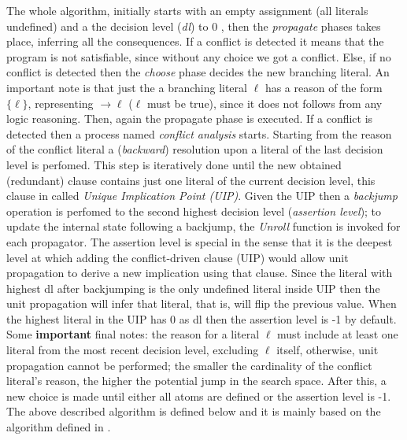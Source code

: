 The whole algorithm, initially starts with an empty assignment (all literals undefined)
and a the decision level (\textit{dl}) to 0  ,
then the \textit{propagate} phases takes place, inferring all the consequences.
If a conflict is detected it means that the program is not satisfiable, since 
without any choice we got a conflict.
Else, if no conflict is detected then the \textit{choose} phase decides the new branching literal.
An important note is that just the a branching literal $\ell$ has a reason of the form $\{\ell\}$, representing
$\rightarrow \ell$ ($\ell$ must be true), since it 
does not follows from any logic reasoning.
Then, again the propagate phase is executed.
If a conflict is detected then a process named \textit{conflict analysis} starts.
Starting from the reason of the conflict literal a (\textit{backward}) resolution upon a literal of the last
decision level is perfomed. This step is iteratively done until the new obtained (redundant) clause 
contains just one literal of the current decision level, this clause in called
\textit{Unique Implication Point (UIP)}.
Given the UIP then a \textit{backjump} operation is perfomed to the second highest decision level
(\textit{assertion level}); to update the internal state following a backjump, the \textit{Unroll}
function is invoked for each propagator.
The assertion level is special in the sense that it is the deepest level
at which adding the conﬂict-driven clause (UIP) would allow unit propagation to derive
a new implication using that clause. Since the literal with highest dl after backjumping 
is the only undefined literal inside UIP then the unit propagation will infer that literal,
that is, will flip the previous value.
When the highest literal in the UIP has 0 as dl then the assertion level is -1 by default.
Some \textbf{important} final notes: the reason for a literal $\ell$
must include at least one literal from the most recent decision level, excluding $\ell$
itself, otherwise, unit propagation 
cannot be performed; the smaller the cardinality of the conflict literal's reason, 
the higher the potential jump in the search space.
After this, a new choice is made until either all atoms are defined or the
assertion level is -1.
The above described algorithm is defined below and it is mainly based on the algorithm 
defined in \cite{DBLP:series/faia/SilvaLM09}.
